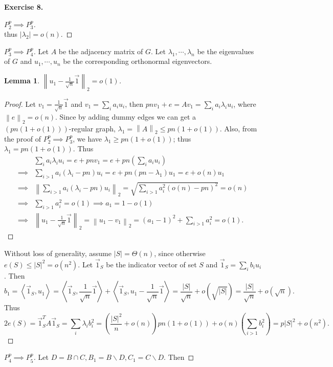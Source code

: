 \documentclass[a4paper]{article}
\newtheorem{lemma}{Lemma}
\newtheorem*{proof}{Proof}
\newenvironment{exercise}[1]{
	\par
	\noindent\textbf{Exercise #1.}\quad
}{
	\par
	\bigskip
}
\newcommand{\vabs}[1]{\left\| #1 \right\|}
\newcommand{\abra}[1]{\left\langle #1 \right\rangle}
\newcommand{\pbra}[1]{\left( #1 \right)}
\begin{document}
\begin{exercise}{8}
\begin{proof}[$P_2^p\implies P^p_3$]
$$        $$
        thus $|\lambda_2|=o(n)$.
    \end{proof}
    \begin{proof}[$P_3^p\implies P_4^p$]
        Let $A$ be the adjacency matrix of $G$.
        Let $\lambda_1,\cdots,\lambda_n$ be the eigenvalues of $G$ and $u_1,\cdots,u_n$ be the corresponding 
        orthonormal eigenvectors.
        \begin{lemma}
            $\vabs{u_1-\frac1{\sqrt n}\vec1}_2=o(1)$.
        \end{lemma}
        \begin{proof}
            Let $v_1=\frac1{\sqrt n}\vec1$ and $v_1=\sum_ia_iu_i$, then $pnv_1+e=Av_1=\sum_ia_i\lambda_iu_i$,
            where $\vabs{e}_2=o(n)$.
            Since by adding dummy edges we can get a $(pn(1+o(1)))$-regular graph, $\lambda_1=\vabs{A}_2\leq pn(1+o(1))$.
            Also, from the proof of $P_2^p\implies P_3^p$, we have $\lambda_1\geq pn(1+o(1))$; thus $\lambda_1=pn(1+o(1))$.
            Thus
            \begin{align*}
                &\sum_ia_i\lambda_iu_i=e+pnv_1=e+pn\pbra{\sum_ia_iu_i}\\
                \implies&\sum_{i>1}a_i\pbra{\lambda_i-pn}u_i=e+pn(pn-\lambda_1)u_1=e+o(n)u_1\\
                \implies&\vabs{\sum_{i>1}a_i\pbra{\lambda_i-pn}u_i}_2=\sqrt{\sum_{i>1}a_i^2(o(n)-pn)^2}=o(n)\\
                \implies&\sum_{i>1}a_i^2=o(1)\implies a_1=1-o(1)\\
                \implies&\vabs{u_1-\frac1{\sqrt n}\vec1}_2=\vabs{u_1-v_1}_2=(a_1-1)^2+\sum_{i>1}a_i^2=o(1).
            \end{align*}
        \end{proof}
        Without loss of generality, assume $|S|=\Theta(n)$, since otherwise $e(S)\leq|S|^2=o(n^2)$.
        Let $\vec1_S$ be the indicator vector of set $S$ and $\vec1_S=\sum_ib_iu_i$.
        Then
        $$
        b_1=\abra{\vec1_S,u_1}=\abra{\vec1_S,\frac1{\sqrt n}\vec1}+\abra{\vec1_S,u_1-\frac1{\sqrt n}\vec1}
        =\frac{|S|}{\sqrt n}+o(\sqrt{|S|})=\frac{|S|}{\sqrt n}+o(\sqrt{n}).
        $$
        Thus 
        $$
        2e(S)=\vec1_S^TA\vec1_S=\sum_i\lambda_ib_i^2=\pbra{\frac{|S|^2}{n}+o(n)}pn(1+o(1))+o(n)\pbra{\sum_{i>1}b_i^2}
        =p|S|^2+o(n^2).
        $$
    \end{proof}
    \begin{proof}[$P_4^p\implies P_5^p$]
        Let $D=B\cap C,B_1=B\backslash D,C_1=C\backslash D$. Then

\end{proof}
\end{exercise}
\end{document}
